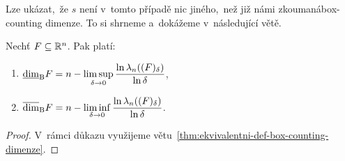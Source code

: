 Lze ukázat,~že $s$ není v~tomto případě nic jiného,~než již námi zkoumaná\linebreak{}box-counting dimenze. To si shrneme a~dokážeme v~následující větě.
\begin{theorem}\label{thm:bc-dimenze-lebesgueova-mira}
    Nechť $F\subseteq\mathbb{R}^n$. Pak platí: 
    \begin{enumerate}[label=(\roman*)]
        \item $\underline{\dim}_\textup{B}{F}=n-\limsup\limits_{\delta\to 0}\dfrac{\ln{\ensuremath{\lambda_n}((F)_\delta)}}{\ln{\delta}}$,
        \item $\overline{\dim}_\textup{B}{F}=n-\liminf\limits_{\delta\to 0}\dfrac{\ln{\ensuremath{\lambda_n}((F)_\delta)}}{\ln{\delta}}$.
    \end{enumerate}
\end{theorem}
\begin{proof}
    V~rámci důkazu využijeme větu~\ref{thm:ekvivalentni-def-box-counting-dimenze}.


\end{proof}

